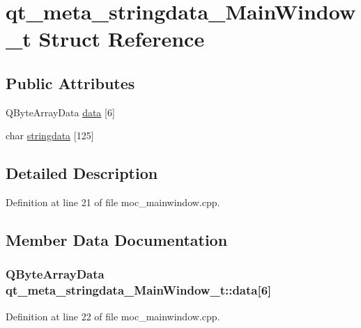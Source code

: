 \hypertarget{structqt__meta__stringdata___main_window__t}{}\section{qt\+\_\+meta\+\_\+stringdata\+\_\+\+Main\+Window\+\_\+t Struct Reference}
\label{structqt__meta__stringdata___main_window__t}
\subsection*{Public Attributes}
\begin{DoxyCompactItemize}
\item 
Q\+Byte\+Array\+Data \hyperlink{structqt__meta__stringdata___main_window__t_a8f79e56d12892a8825330286a07da625}{data} \mbox{[}6\mbox{]}
\item 
char \hyperlink{structqt__meta__stringdata___main_window__t_a83a4e6119d3600df5ed2ecd99c255853}{stringdata} \mbox{[}125\mbox{]}
\end{DoxyCompactItemize}


\subsection{Detailed Description}


Definition at line 21 of file moc\+\_\+mainwindow.\+cpp.



\subsection{Member Data Documentation}
\hypertarget{structqt__meta__stringdata___main_window__t_a8f79e56d12892a8825330286a07da625}{}
\subsubsection[{data}]{\setlength{\rightskip}{0pt plus 5cm}Q\+Byte\+Array\+Data qt\+\_\+meta\+\_\+stringdata\+\_\+\+Main\+Window\+\_\+t\+::data\mbox{[}6\mbox{]}}\label{structqt__meta__stringdata___main_window__t_a8f79e56d12892a8825330286a07da625}


Definition at line 22 of file moc\+\_\+mainwindow.\+cpp.

